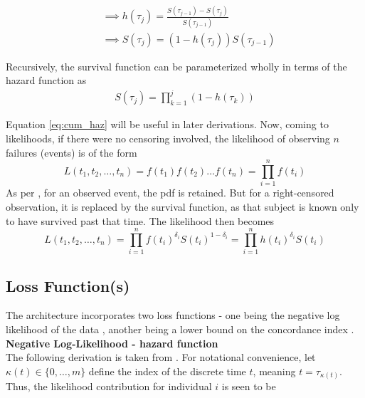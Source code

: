 \documentclass[%
 reprint,
 amsmath,amssymb,
 aps,nofootinbib
]{revtex4-2}
\begin{document}
\begin{align*}
&\implies  h(\tau_j) = \frac{S(\tau_{j-1}) - S(\tau_j)}{S(\tau_{j-1})}\\
&\implies S(\tau_j) = (1 - h(\tau_j))S(\tau_{j-1})
\end{align*}

Recursively, the survival function can be parameterized wholly in terms of the hazard function as
\begin{align}
S(\tau_j) = \prod_{k=1}^{j}(1 - h(\tau_k)) \label{eq:cum_haz}
\end{align}

Equation \ref{eq:cum_haz} will be useful in later derivations. Now, coming to likelihoods, if there were no censoring involved, the likelihood of observing $n$ failures (events) is of the form
\[
L(t_1 , t_2 , \ldots , t_n) = f(t_1)f(t_2)\ldots f(t_n)=\prod^{n}_{i=1}f(t_i)
\]
As per \cite{Moore_2016}, for an observed event, the pdf is retained. But for a right-censored observation, it is replaced by the survival function, as that subject is known only to have survived past that time. The likelihood then becomes
\[
L(t_1 , t_2 , \ldots , t_n) = \prod^{n}_{i=1}f(t_i)^{\delta_i}S(t_i)^{1-\delta_i}=\prod^{n}_{i=1}h(t_i)^{\delta_i}S(t_i)
\]

\subsection{\label{loss}Loss Function(s)}
The architecture incorporates two loss functions - one being the negative log likelihood of the data \cite{kvamme_continuous_2019}, another being a lower bound on the concordance index \cite{raykar_cindex}.\\

\textbf{Negative Log-Likelihood - hazard function}\\
The following derivation is taken from \cite{kvamme_continuous_2019}. For notational convenience, let $\kappa(t) \in \{0, \ldots , m\}$ define the index of the discrete time $t$, meaning $t = \tau_{\kappa(t)}$. Thus, the likelihood contribution for individual $i$ is seen to be 
\end{document}
